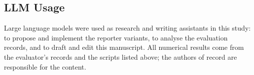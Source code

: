 \documentclass{article}
\begin{document}
\subsection{LLM Usage}
Large language models were used as research and writing assistants in this study: to propose and implement the reporter variants, to analyse the evaluation records, and to draft and edit this manuscript. All numerical results come from the evaluator's records and the scripts listed above; the authors of record are responsible for the content.
\end{document}
